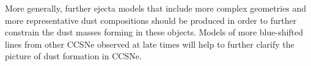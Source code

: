 More generally, further ejecta models that include more complex geometries and   more representative dust  compositions should be produced in order to further constrain the dust masses forming in these objects. Models of more blue-shifted lines from other CCSNe observed at late times will help to further clarify the picture of dust formation in CCSNe.

%
% 

